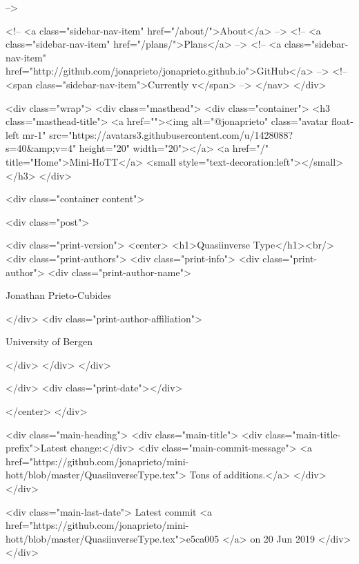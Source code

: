       
     -->

    <!-- <a class="sidebar-nav-item" href="/about/">About</a> -->
    <!-- <a class="sidebar-nav-item" href="/plans/">Plans</a> -->
    <!-- <a class="sidebar-nav-item" href="http://github.com/jonaprieto/jonaprieto.github.io">GitHub</a> -->
    <!-- <span class="sidebar-nav-item">Currently v</span> -->
  </nav>
</div>

    <div class="wrap">
      <div class="masthead">
        <div class="container">
          <h3 class="masthead-title">
            <a href=""><img alt="@jonaprieto" class="avatar float-left mr-1" src="https://avatars3.githubusercontent.com/u/1428088?s=40&amp;v=4" height="20" width="20"></a>
            <a href="/" title="Home">Mini-HoTT</a>
            <small style="text-decoration:left"></small>
          </h3>
        </div>
      
      <div class="container content">
        







<div class="post">

  <div class="print-version">
    <center>
      <h1>Quasiinverse Type</h1><br/>
        <div class="print-authors">
          <div class="print-info">
            <div class="print-author">
              <div class="print-author-name">
                
                  Jonathan Prieto-Cubides
                
              </div>
              <div class="print-author-affiliation">
                
                  University of Bergen
                
                </div>
            </div>
          </div>
          
          
        </div>
        <div class="print-date"></div>
        
        
    </center>
  </div>

  
  <div class="main-heading">
    <div class="main-title">
      <div class="main-title-prefix">Latest change:</div>
      <div class="main-commit-message">
            <a href="https://github.com/jonaprieto/mini-hott/blob/master/QuasiinverseType.tex">
              Tons of additions.</a>
      </div>
    </div>

    <div class="main-last-date">
      Latest commit <a href="https://github.com/jonaprieto/mini-hott/blob/master/QuasiinverseType.tex">e5ca005 </a> on  20 Jun 2019
    </div>
  </div>
  
